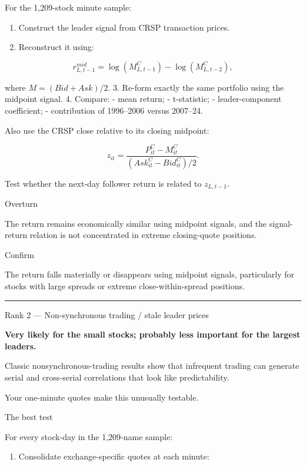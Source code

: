 For the 1,209-stock minute sample:

\begin{enumerate}
\def\labelenumi{\arabic{enumi}.}
\tightlist
\item
  Construct the leader signal from CRSP transaction prices.
\item
  Reconstruct it using:
\end{enumerate}

\[
  r^{mid}_{L,t-1}
     =
     \log(M_{L,t-1}^{C})-\log(M_{L,t-2}^{C}),
  \]

where \(M=(Bid+Ask)/2\).
3. Re-form exactly the same portfolio using the midpoint signal.
4. Compare:
- mean return;
- t-statistic;
- leader-component coefficient;
- contribution of 1996--2006 versus 2007--24.

Also use the CRSP close relative to its closing midpoint:

\[
z_{it}
=
\frac{P^C_{it}-M^C_{it}}
{(Ask^C_{it}-Bid^C_{it})/2}.
\]

Test whether the next-day follower return is related to \(z_{L,t-1}\).

Overturn

The return remains economically similar using midpoint signals, and the signal-return relation is not concentrated in extreme closing-quote positions.

Confirm

The return falls materially or disappears using midpoint signals, particularly for stocks with large spreads or extreme close-within-spread positions.

\begin{center}\rule{0.5\linewidth}{0.5pt}\end{center}

Rank 2 --- Non-synchronous trading / stale leader prices

\textbf{Very likely for the small stocks; probably less important for the largest leaders.}

Classic nonsynchronous-trading results show that infrequent trading can generate serial and cross-serial correlations that look like predictability.

Your one-minute quotes make this unusually testable.

The best test

For every stock-day in the 1,209-name sample:

\begin{enumerate}
\def\labelenumi{\arabic{enumi}.}
\tightlist
\item
  Consolidate exchange-specific quotes at each minute:
\end{enumerate}

